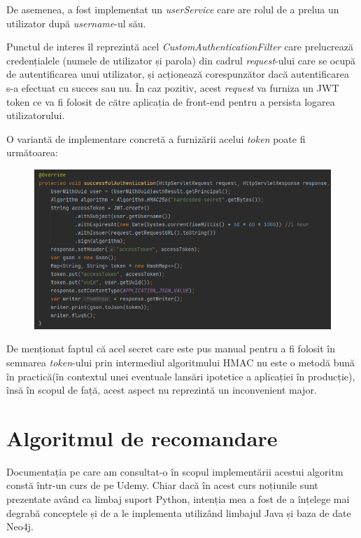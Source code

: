 \documentclass[12pt,a4paper]{report}
\begin{document}
De asemenea, a fost implementat un \emph{userService} care are rolul de a prelua un utilizator după \emph{username}-ul său.

Punctul de interes îl reprezintă acel \emph{CustomAuthenticationFilter} care prelucrează credențialele
(numele de utilizator și parola) din cadrul \emph{request}-ului care se ocupă de autentificarea unui utilizator, și acționează corespunzător dacă autentificarea s-a efectuat cu succes sau nu. În caz pozitiv, acest \emph{request} va furniza un JWT token ce va fi folosit de către aplicația de front-end pentru a persista logarea utilizatorului.

O variantă de implementare concretă a furnizării acelui \emph{token} poate fi următoarea:


\begin{figure}[H]
\centering
\caption{}
\includegraphics[scale = 0.75]{exemplu_24_jwt}
\caption*{}
\end{figure}

De menționat faptul că acel secret care este pus manual pentru a fi folosit în semnarea \emph{token}-ului prin intermediul algoritmului HMAC nu este o metodă bună în practică(în contextul unei eventuale lansări ipotetice a aplicației în producție), însă în scopul de față, acest aspect nu reprezintă un inconvenient major.


\newpage



\section{Algoritmul de recomandare}

Documentația pe care am consultat-o în scopul implementării acestui algoritm constă într-un curs de pe Udemy. \cite{27} Chiar dacă în acest curs noțiunile sunt prezentate având ca limbaj suport Python, intenția mea a fost de a înțelege mai degrabă conceptele și de a le implementa utilizând limbajul Java și baza de date Neo4j.
\end{document}
